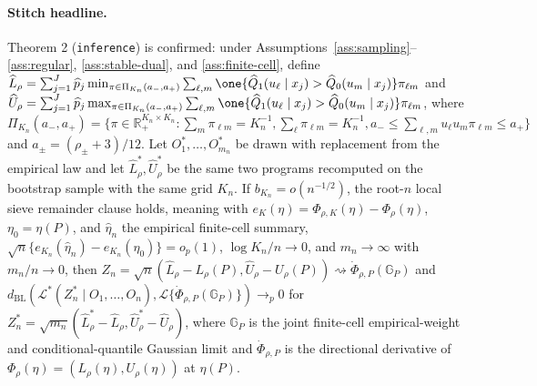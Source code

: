 \begin{theorem}
\paragraph{Stitch headline.}
Theorem 2 (\texttt{inference}) is confirmed: under Assumptions~\ref{ass:sampling}--\ref{ass:regular}, \ref{ass:stable-dual}, and \ref{ass:finite-cell}, define \(\widehat L_\rho=\sum_{j=1}^J\widehat p_j\min_{\pi\in\Pi_{K_n}(a_-,a_+)}\sum_{\ell,m}\one\{\widehat Q_1(u_\ell\mid x_j)>\widehat Q_0(u_m\mid x_j)\}\pi_{\ell m}\) and \(\widehat U_\rho=\sum_{j=1}^J\widehat p_j\max_{\pi\in\Pi_{K_n}(a_-,a_+)}\sum_{\ell,m}\one\{\widehat Q_1(u_\ell\mid x_j)>\widehat Q_0(u_m\mid x_j)\}\pi_{\ell m}\), where \(\Pi_{K_n}(a_-,a_+)=\{\pi\in\mathbb R_+^{K_n\times K_n}:\sum_m\pi_{\ell m}=K_n^{-1},\sum_\ell\pi_{\ell m}=K_n^{-1},a_-\le\sum_{\ell,m}u_\ell u_m\pi_{\ell m}\le a_+\}\) and \(a_\pm=(\rho_\pm+3)/12\). Let \(O_1^*,\ldots,O_{m_n}^*\) be drawn with replacement from the empirical law and let \(\widehat L_\rho^*,\widehat U_\rho^*\) be the same two programs recomputed on the bootstrap sample with the same grid \(K_n\). If \(b_{K_n}=o(n^{-1/2})\), the root-\(n\) local sieve remainder clause holds, meaning with \(e_K(\eta)=\Phi_{\rho,K}(\eta)-\Phi_\rho(\eta)\), \(\eta_0=\eta(P)\), and \(\widehat\eta_n\) the empirical finite-cell summary, \(\sqrt n\{e_{K_n}(\widehat\eta_n)-e_{K_n}(\eta_0)\}=o_p(1)\), \(\log K_n/n\to0\), and \(m_n\to\infty\) with \(m_n/n\to0\), then \(Z_n=\sqrt n(\widehat L_\rho-L_\rho(P),\widehat U_\rho-U_\rho(P))\rightsquigarrow\dot\Phi_{\rho,P}(\mathbb G_P)\) and \(d_{\mathrm{BL}}(\mathcal L^*(Z_n^*\mid O_1,\ldots,O_n),\mathcal L\{\dot\Phi_{\rho,P}(\mathbb G_P)\})\to_p0\) for \(Z_n^*=\sqrt{m_n}(\widehat L_\rho^*-\widehat L_\rho,\widehat U_\rho^*-\widehat U_\rho)\), where \(\mathbb G_P\) is the joint finite-cell empirical-weight and conditional-quantile Gaussian limit and \(\dot\Phi_{\rho,P}\) is the directional derivative of \(\Phi_\rho(\eta)=(L_\rho(\eta),U_\rho(\eta))\) at \(\eta(P)\).
\end{theorem}

